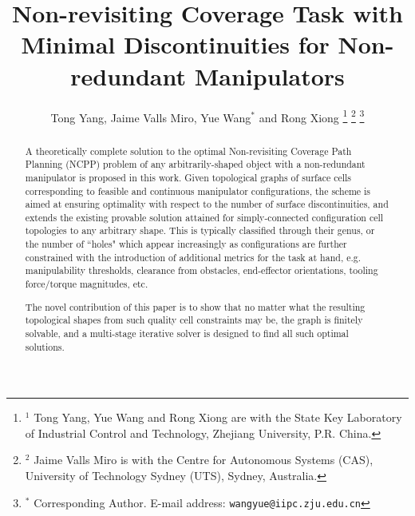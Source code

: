 \documentclass[journal]{IEEEtran}
\begin{document}
\title{Non-revisiting Coverage Task with Minimal Discontinuities for Non-redundant Manipulators}



\author{Tong Yang, Jaime Valls Miro, Yue Wang$^*$ and Rong Xiong
\thanks{$^1$ Tong Yang, Yue Wang and Rong Xiong are with the State Key 
Laboratory of Industrial Control and Technology, Zhejiang University, P.R. China. 
}
\thanks{$^2$ Jaime Valls Miro is with the Centre for Autonomous Systems (CAS), University of Technology Sydney (UTS), Sydney, Australia.}
\thanks{$^*$ Corresponding Author. \newline \indent
E-mail address: {\tt\small wangyue@iipc.zju.edu.cn}}
}

\maketitle

\begin{abstract}
A theoretically complete solution to the optimal Non-revisiting Coverage Path Planning (NCPP) problem of any arbitrarily-shaped 
object with a non-redundant manipulator is proposed in this work. 
Given topological graphs of surface cells corresponding to feasible and continuous manipulator configurations, 
the scheme is aimed at ensuring optimality with respect to the number of surface discontinuities,  
and extends the existing provable solution attained for simply-connected configuration cell topologies to any arbitrary shape. 
This is typically classified through their genus, or the number of ``holes" 
which appear increasingly as configurations are further constrained with the introduction of additional metrics for the
 task at hand, e.g. manipulability thresholds, clearance from obstacles, end-effector orientations, tooling force/torque magnitudes, etc.


The novel contribution of this paper is to show that no matter what the resulting topological shapes from such quality cell constraints may be, the graph is finitely solvable, and a multi-stage iterative solver is designed to find all such optimal solutions. 
\end{abstract}
\end{document}
